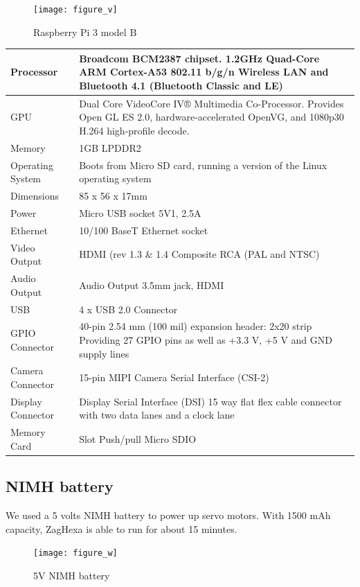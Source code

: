 \begin{figure}[H]
	\centering
	\texttt{[image: figure\_v]}
	\caption{Raspberry Pi 3 model B}
	\label{figure_v}
\end{figure}
\begin{center}
\begin{tabular}{ |l||p{12cm}|}
	\hline
	Processor      & Broadcom BCM2387 chipset. 1.2GHz Quad-Core ARM Cortex-A53 802.11 b/g/n Wireless LAN and Bluetooth 4.1 (Bluetooth Classic and LE)\\ \hline
	GPU               & Dual Core VideoCore IV® Multimedia Co-Processor. Provides Open GL ES 2.0, hardware-accelerated OpenVG, and 1080p30 H.264 high-profile decode. \\ \hline
	Memory          & 1GB LPDDR2  \\ \hline
	Operating System  & Boots from Micro SD card, running a version of the Linux operating system  \\ \hline
	Dimensions     & 85 x 56 x 17mm  \\ \hline
	Power             & Micro USB socket 5V1, 2.5A  \\ \hline
	Ethernet          & 10/100 BaseT Ethernet socket  \\ \hline
	Video Output   & HDMI (rev 1.3 \& 1.4 Composite RCA (PAL and NTSC)  \\ \hline
	Audio Output   & Audio Output 3.5mm jack, HDMI     \\ \hline
	USB                 & 4 x USB 2.0 Connector   \\ \hline
	GPIO Connector    & 40-pin 2.54 mm (100 mil) expansion header: 2x20 strip Providing 27 GPIO pins as well as +3.3 V, +5 V and GND supply lines \\ \hline
	Camera Connector  & 15-pin MIPI Camera Serial Interface (CSI-2) \\ \hline
	Display Connector & Display Serial Interface (DSI) 15 way flat flex cable connector with two data lanes and a clock lane    \\ \hline
	Memory Card       & Slot Push/pull Micro SDIO  \\ \hline
\end{tabular}
\end{center}


\subsection{NIMH battery}
We used a 5 volts NIMH battery to power up servo motors. With 1500 mAh capacity, ZagHexa is able to run for about 15 minutes.

\begin{figure}[H]
	\centering
	\texttt{[image: figure\_w]}
	\caption{5V NIMH battery}
	\label{figure_w}
\end{figure}